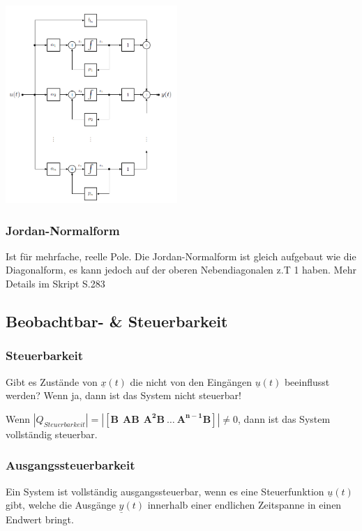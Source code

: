 \begin{multicols}{2}
\columnbreak

  \includegraphics[width=6.5cm]{./images/zrd-diagonalform}
\end{multicols}

\subsubsection{Jordan-Normalform }
  Ist für mehrfache, reelle Pole. Die Jordan-Normalform ist gleich aufgebaut wie die Diagonalform, 
  es kann jedoch auf der oberen Nebendiagonalen z.T 1 haben. 
  Mehr Details im Skript S.283



\subsection{Beobachtbar- \& Steuerbarkeit }
\subsubsection{Steuerbarkeit  }
Gibt es Zustände von $\underline{x} (t)$ die nicht von den
Eingängen $\underline{u} (t)$ beeinflusst werden? Wenn ja,
dann ist das System nicht steuerbar!

Wenn $|Q_{Steuerbarkeit}|= \left| \left [ \boldsymbol{B~~AB~~ A^2B~\ldots~
A^{n-1}B} \right ] \right|  \neq 0$, dann ist das System vollständig steuerbar.

\subsubsection{Ausgangssteuerbarkeit}
Ein System ist vollständig ausgangssteuerbar, wenn es eine Steuerfunktion $\underline{u} (t)$ gibt,
welche die Ausgänge $\underline{y}(t)$ innerhalb einer endlichen Zeitspanne in einen Endwert bringt.

